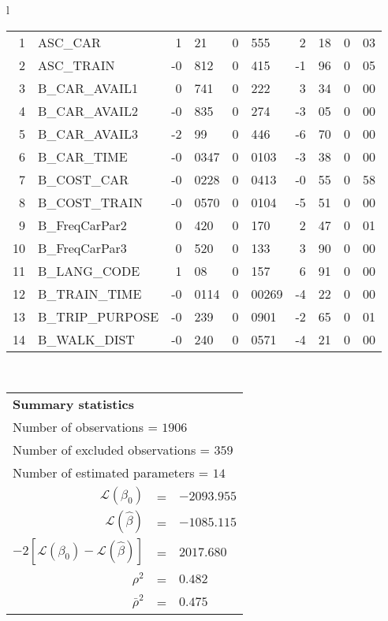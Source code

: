 \begin{tabular}{l}
\begin{tabular}{rlr@{.}lr@{.}lr@{.}lr@{.}l}
1 & ASC_CAR & 1&21 & 0&555 & 2&18 & 0&03\\
2 & ASC_TRAIN & -0&812 & 0&415 & -1&96 & 0&05\\
3 & B_CAR_AVAIL1 & 0&741 & 0&222 & 3&34 & 0&00\\
4 & B_CAR_AVAIL2 & -0&835 & 0&274 & -3&05 & 0&00\\
5 & B_CAR_AVAIL3 & -2&99 & 0&446 & -6&70 & 0&00\\
6 & B_CAR_TIME & -0&0347 & 0&0103 & -3&38 & 0&00\\
7 & B_COST_CAR & -0&0228 & 0&0413 & -0&55 & 0&58\\
8 & B_COST_TRAIN & -0&0570 & 0&0104 & -5&51 & 0&00\\
9 & B_FreqCarPar2 & 0&420 & 0&170 & 2&47 & 0&01\\
10 & B_FreqCarPar3 & 0&520 & 0&133 & 3&90 & 0&00\\
11 & B_LANG_CODE & 1&08 & 0&157 & 6&91 & 0&00\\
12 & B_TRAIN_TIME & -0&0114 & 0&00269 & -4&22 & 0&00\\
13 & B_TRIP_PURPOSE & -0&239 & 0&0901 & -2&65 & 0&01\\
14 & B_WALK_DIST & -0&240 & 0&0571 & -4&21 & 0&00\\
\hline
\end{tabular}
\\
\begin{tabular}{rcl}
\multicolumn{3}{l}{\bf Summary statistics}\\
\multicolumn{3}{l}{ Number of observations = $1906$} \\
\multicolumn{3}{l}{ Number of excluded observations = $359$} \\
\multicolumn{3}{l}{ Number of estimated  parameters = $14$} \\
 $\mathcal{L}(\beta_0)$ &=&  $-2093.955$ \\
 $\mathcal{L}(\hat{\beta})$ &=& $-1085.115 $  \\
 $-2[\mathcal{L}(\beta_0) -\mathcal{L}(\hat{\beta})]$ &=& $2017.680$ \\
    $\rho^2$ &=&   $0.482$ \\
    $\bar{\rho}^2$ &=&    $0.475$ \\
\end{tabular}
  \end{tabular}
